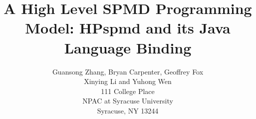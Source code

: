 
\date{}      %

\title{\bf A High Level SPMD Programming Model: HPspmd and its Java
Language Binding}

\author{Guansong Zhang, Bryan Carpenter, Geoffrey Fox\\
  Xinying Li and Yuhong Wen  \\
  111 College Place \\
  NPAC at Syracuse University \\
  Syracuse, NY 13244
}

\maketitle
\thispagestyle{empty}

